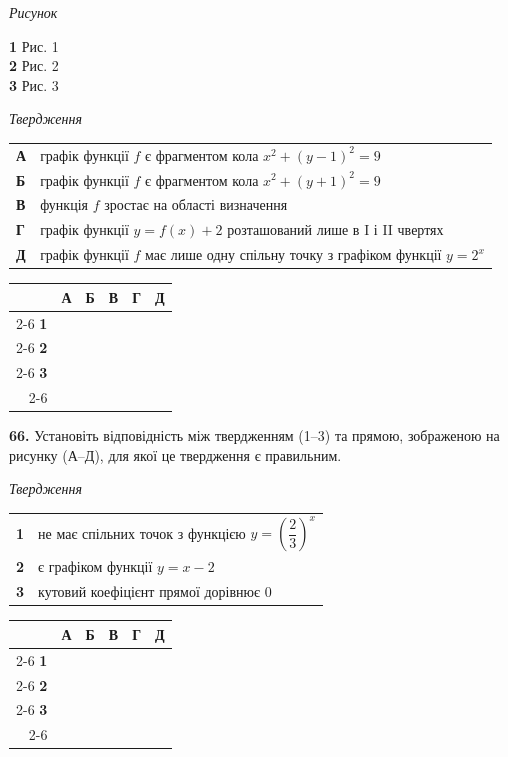 \documentclass[14pt]{extarticle}
\newcommand{\answerGrid}{
    \begingroup
    \setlength{\tabcolsep}{4pt}
    \renewcommand{\arraystretch}{1.2}
    \small
    \begin{tabular}{r|c|c|c|c|c|}
         \multicolumn{1}{c}{} & \multicolumn{1}{c}{\textbf{А}} & \multicolumn{1}{c}{\textbf{Б}} & \multicolumn{1}{c}{\textbf{В}} & \multicolumn{1}{c}{\textbf{Г}} & \multicolumn{1}{c}{\textbf{Д}} \\ \cline{2-6}
         \textbf{1} & & & & & \\ \cline{2-6}
         \textbf{2} & & & & & \\ \cline{2-6}
         \textbf{3} & & & & & \\ \cline{2-6}
    \end{tabular}
    \endgroup
}
\begin{document}
\vspace{0.3cm}

\noindent
\begin{minipage}[t]{0.20\textwidth}
    \textit{Рисунок} \par \vspace{0.2cm}
    \textbf{1} \quad Рис. 1 \\[0.3cm]
    \textbf{2} \quad Рис. 2 \\[0.3cm]
    \textbf{3} \quad Рис. 3
\end{minipage}%
\hfill
\begin{minipage}[t]{0.50\textwidth}
    \textit{Твердження} \par \vspace{0.2cm}
    \begin{tabular}{@{}p{0.5cm} p{7cm}@{}}
    \textbf{А} & графік функції $f$ є фрагментом кола $x^2 + (y-1)^2 = 9$ \\[0.2cm]
    \textbf{Б} & графік функції $f$ є фрагментом кола $x^2 + (y+1)^2 = 9$ \\[0.2cm]
    \textbf{В} & функція $f$ зростає на області визначення \\[0.2cm]
    \textbf{Г} & графік функції $y=f(x)+2$ розташований лише в I і II чвертях \\[0.2cm]
    \textbf{Д} & графік функції $f$ має лише одну спільну точку з графіком функції \colorbox{yellow!30}{$y=2^x$} \\
    \end{tabular}
\end{minipage}%
\hfill
\begin{minipage}[t]{0.25\textwidth}
    \vspace{0.5cm}
    \answerGrid
\end{minipage}

\vspace{0.7cm}

\noindent\textbf{66.} Установіть відповідність між твердженням (1--3) та прямою, зображеною на рисунку (А--Д), для якої це твердження є правильним.

\vspace{0.3cm}

\noindent
\begin{minipage}[t]{0.60\textwidth}
    \textit{Твердження} \par \vspace{0.2cm}
    \begin{tabular}{@{}p{0.4cm} p{9cm}@{}}
    \textbf{1} & не має спільних точок з функцією \colorbox{yellow!30}{$y=\left(\dfrac{2}{3}\right)^x$} \\[0.4cm]
    \textbf{2} & є графіком функції $y=x-2$ \\[0.4cm]
    \textbf{3} & кутовий коефіцієнт прямої дорівнює $0$ \\
    \end{tabular}
\end{minipage}%
\hfill
\begin{minipage}[t]{0.30\textwidth}
    \vspace{0.5cm}
    \answerGrid
\end{minipage}
\end{document}
